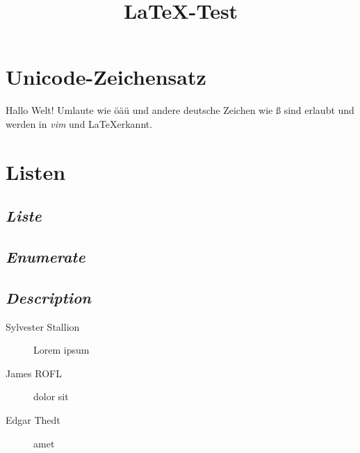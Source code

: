 
\title{\LaTeX-Test}

\maketitle
\section{Unicode-Zeichensatz}
Hallo Welt!
Umlaute wie öäü und andere deutsche Zeichen wie ß sind erlaubt und werden in \emph{vim} und \LaTeX erkannt.


\section{Listen}

\subsection{\emph{Liste}}

\subsection{\emph{Enumerate}}

\subsection{\emph{Description}}
\begin{description}
	\item[Sylvester Stallion] Lorem ipsum 
	\item[James ROFL] dolor sit
	\item[Edgar Thedt] amet
\end{description}


